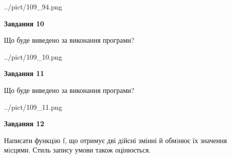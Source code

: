 \documentclass[12pt, ukrainian]{article}
\begin{document}
{\begin {large}
\begin{center}
	{../pict/109_94.png}
\end{center}
\newpage

{\begin {center}\textbf{Завдання 10}\end {center}}

Що буде виведено за виконання програми?\par
\begin{center}
	{../pict/109_10.png}
\end{center}
\newpage

{\begin {center}\textbf{Завдання 11}\end {center}}

Що буде виведено за виконання програми?\par
\begin{center}
	{../pict/109_11.png}
\end{center}
\newpage

{\begin {center}\textbf{Завдання 12}\end {center}}


Написати функцiю f, що отримує дві дiйсні змінні й обмiнює їх значення мiсцями. Стиль запису умови також оцінюється.\par
\newpage

\end {large}}
\end{document}
